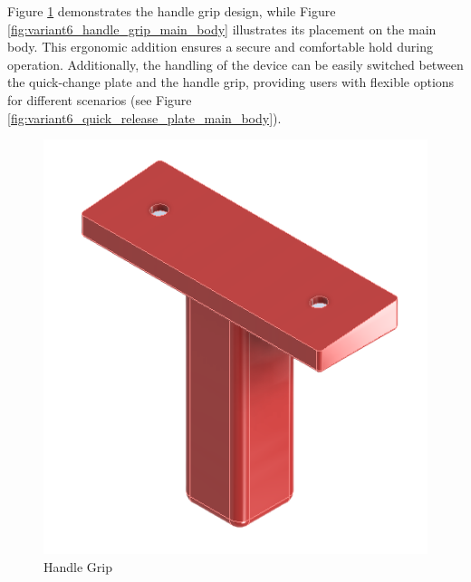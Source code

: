 Figure \ref{fig:variant6_handle_grip} demonstrates the handle grip design, while Figure \ref{fig:variant6_handle_grip_main_body} illustrates its placement on the main body. This ergonomic addition ensures a secure and comfortable hold during operation. Additionally, the handling of the device can be easily switched between the quick-change plate and the handle grip, providing users with flexible options for different scenarios (see Figure \ref{fig:variant6_quick_release_plate_main_body}).

\begin{figure}[!ht]
    \centering
    \includegraphics[width=0.5\linewidth]{texs/Part1/chapter4/image/v65.png}
    \caption{Handle Grip}
    \label{fig:variant6_handle_grip}
\end{figure}

